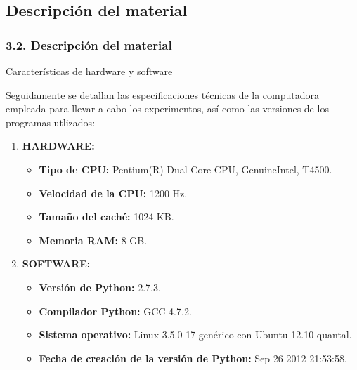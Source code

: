 \documentclass{beamer}
\begin{document}
\subsection{Descripción del material}
\begin{frame}
\frametitle{3.2. Descripción del material}
\begin{block}{Características de hardware y software}

Seguidamente se detallan las especificaciones técnicas de la computadora empleada
para llevar a cabo los experimentos, así como las versiones de los programas utlizados:
\pause

\begin{enumerate}

    \item
      \textbf{HARDWARE:}
      \begin{itemize}    
          \item
            \textbf{Tipo de CPU:} Pentium(R) Dual-Core CPU, GenuineIntel, T4500.
          \item
            \textbf{Velocidad de la CPU:} 1200 Hz.
          \item
            \textbf{Tamaño del caché:} 1024 KB.
          \item
            \textbf{Memoria RAM:} 8 GB.
      \end{itemize}

\pause

    \item
      \textbf{SOFTWARE:}
      \begin{itemize}
        \item      
          \textbf{Versión de Python:} 2.7.3.
        \item
          \textbf{Compilador Python:} GCC 4.7.2.
        \item
          \textbf{Sistema operativo:} Linux-3.5.0-17-genérico con Ubuntu-12.10-quantal.
        \item
          \textbf{Fecha de creación de la versión de Python:} Sep 26 2012 21:53:58.
      \end{itemize}

\end{enumerate}

\end{block}
\end{frame}

\end{document}
